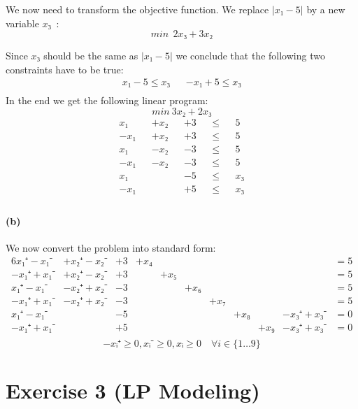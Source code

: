 \documentclass[a4paper, 12pt]{report}
\begin{document}
We now need to transform the objective function. We replace $|x₁-5|$ by a new
variable $x₃$~\cite{LP_Solve_Absolute_Values}:
\[
    min ~~ 2x₃+ 3x₂
\]

Since $x₃$ should be the same as $|x₁-5|$ we conclude that the following two
constraints have to be true:
\begin{align*}
    x₁-5 ≤ x₃ && -x₁+5 ≤ x₃\\
\end{align*}
In the end we get the following linear program:
\[
    min~ 3x₂ + 2x₃
\]
\begin{align*}
     x₁ && +x₂ && +3  && ≤ && 5  \\
    -x₁ && +x₂ && +3  && ≤ && 5  \\
     x₁ && -x₂ && -3  && ≤ && 5  \\
    -x₁ && -x₂ && -3  && ≤ && 5  \\
     x₁ &&     && -5  && ≤ && x₃ \\
    -x₁ &&     && +5  && ≤ && x₃ \\
\end{align*}

\paragraph{(b)}
We now convert the problem into standard form:
\begin{alignat*}{6}
     x₁⁺- x₁⁻ & +x₂⁺- x₂⁻ & +3  &+x₄&   &   &   &   &     &             &= 5\\
    -x₁⁺+ x₁⁻ & +x₂⁺- x₂⁻ & +3  &   &+x₅&   &   &   &     &             &= 5\\
     x₁⁺- x₁⁻ & -x₂⁺+ x₂⁻ & -3  &   &   &+x₆&   &   &     &             &= 5\\
    -x₁⁺+ x₁⁻ & -x₂⁺+ x₂⁻ & -3  &   &   &   &+x₇&   &     &             &= 5\\
     x₁⁺- x₁⁻ &           & -5  &   &   &   &   &+x₈&     & - x₃⁺ + x₃⁻ &= 0\\
    -x₁⁺+ x₁⁻ &           & +5  &   &   &   &   &   & +x₉ & - x₃⁺ + x₃⁻ &= 0\\
\end{alignat*}
\[
    -xᵢ⁺ ≥ 0, xᵢ⁻ ≥ 0,xᵢ ≥ 0 \quad ∀ i ∈ \{1…9\}
\]

\section{Exercise 3 (LP Modeling)}
\end{document}
